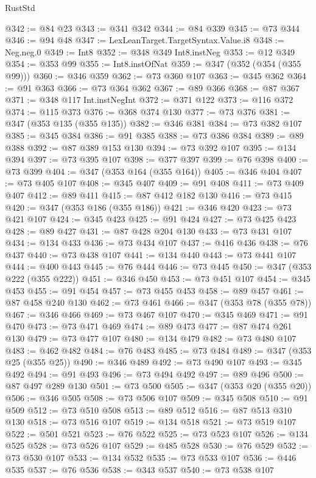 \begin{lexlean}{RustStd}
\begin{coremodule}
{\begin{coremodule}
{{{{{@342 := @84 @23
@343 := @341 @342
@344 := @84 @339
@345 := @73 @344
@346 := @94 @48
@347 := LexLeanTarget.TargetSyntax.Value.i8
@348 := Neg.neg.{0}
@349 := Int8
@352 := @348 @349 Int8.instNeg
@353 := @12 @349
@354 := @353 @99
@355 := Int8.instOfNat
@359 := @347 (@352 (@354 (@355 @99)))
@360 := @346 @359
@362 := @73 @360 @107
@363 := @345 @362
@364 := @91 @363
@366 := @73 @364 @362
@367 := @89 @366
@368 := @87 @367
@371 := @348 @117 Int.instNegInt
@372 := @371 @122
@373 := @116 @372
@374 := @115 @373
@376 := @368 @374 @130
@377 := @73 @376
@381 := @347 (@353 @135 (@355 @135))
@382 := @346 @381
@384 := @73 @382 @107
@385 := @345 @384
@386 := @91 @385
@388 := @73 @386 @384
@389 := @89 @388
@392 := @87 @389 @153 @130
@394 := @73 @392 @107
@395 := @134 @394
@397 := @73 @395 @107
@398 := @377 @397
@399 := @76 @398
@400 := @73 @399
@404 := @347 (@353 @164 (@355 @164))
@405 := @346 @404
@407 := @73 @405 @107
@408 := @345 @407
@409 := @91 @408
@411 := @73 @409 @407
@412 := @89 @411
@415 := @87 @412 @182 @130
@416 := @73 @415
@420 := @347 (@353 @186 (@355 @186))
@421 := @346 @420
@423 := @73 @421 @107
@424 := @345 @423
@425 := @91 @424
@427 := @73 @425 @423
@428 := @89 @427
@431 := @87 @428 @204 @130
@433 := @73 @431 @107
@434 := @134 @433
@436 := @73 @434 @107
@437 := @416 @436
@438 := @76 @437
@440 := @73 @438 @107
@441 := @134 @440
@443 := @73 @441 @107
@444 := @400 @443
@445 := @76 @444
@446 := @73 @445
@450 := @347 (@353 @222 (@355 @222))
@451 := @346 @450
@453 := @73 @451 @107
@454 := @345 @453
@455 := @91 @454
@457 := @73 @455 @453
@458 := @89 @457
@461 := @87 @458 @240 @130
@462 := @73 @461
@466 := @347 (@353 @78 (@355 @78))
@467 := @346 @466
@469 := @73 @467 @107
@470 := @345 @469
@471 := @91 @470
@473 := @73 @471 @469
@474 := @89 @473
@477 := @87 @474 @261 @130
@479 := @73 @477 @107
@480 := @134 @479
@482 := @73 @480 @107
@483 := @462 @482
@484 := @76 @483
@485 := @73 @484
@489 := @347 (@353 @25 (@355 @25))
@490 := @346 @489
@492 := @73 @490 @107
@493 := @345 @492
@494 := @91 @493
@496 := @73 @494 @492
@497 := @89 @496
@500 := @87 @497 @289 @130
@501 := @73 @500
@505 := @347 (@353 @20 (@355 @20))
@506 := @346 @505
@508 := @73 @506 @107
@509 := @345 @508
@510 := @91 @509
@512 := @73 @510 @508
@513 := @89 @512
@516 := @87 @513 @310 @130
@518 := @73 @516 @107
@519 := @134 @518
@521 := @73 @519 @107
@522 := @501 @521
@523 := @76 @522
@525 := @73 @523 @107
@526 := @134 @525
@528 := @73 @526 @107
@529 := @485 @528
@530 := @76 @529
@532 := @73 @530 @107
@533 := @134 @532
@535 := @73 @533 @107
@536 := @446 @535
@537 := @76 @536
@538 := @343 @537
@540 := @73 @538 @107
}}}}}
\end{coremodule}}
\end{coremodule}
\end{lexlean}

